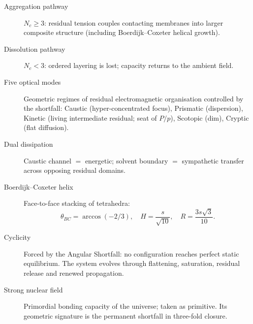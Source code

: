 \begin{description}
\item[Aggregation pathway]
$N_c\ge 3$: residual tension couples contacting membranes into larger composite
structure (including Boerdijk--Coxeter helical growth).

\item[Dissolution pathway]
$N_c<3$: ordered layering is lost; capacity returns to the ambient field.

\item[Five optical modes]
Geometric regimes of residual electromagnetic organisation controlled by the
shortfall: Caustic (hyper-concentrated focus), Prismatic (dispersion),
Kinetic (living intermediate residual; seat of $P/p$), Scotopic (dim),
Cryptic (flat diffusion).

\item[Dual dissipation]
Caustic channel $=$ energetic; solvent boundary $=$ sympathetic transfer across
opposing residual domains.

\item[Boerdijk--Coxeter helix]
Face-to-face stacking of tetrahedra:
\[
\theta_{BC}=\arccos(-2/3),\quad H=\frac{s}{\sqrt{10}},\quad R=\frac{3s\sqrt{3}}{10}.
\]

\item[Cyclicity]
Forced by the Angular Shortfall: no configuration reaches perfect static
equilibrium. The system evolves through flattening, saturation, residual release
and renewed propagation.

\item[Strong nuclear field]
Primordial bonding capacity of the universe; taken as primitive. Its geometric
signature is the permanent shortfall in three-fold closure.
\end{description}
